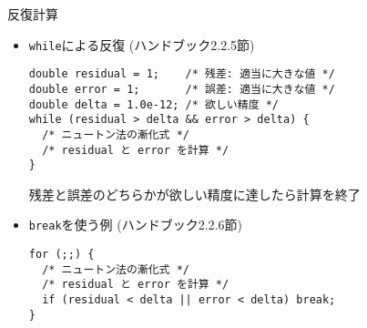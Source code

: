 \begin{frame}[t,fragile]{反復計算}
  \begin{itemize}
  \item {\tt while}による反復 (ハンドブック2.2.5節)
\begin{lstlisting}
double residual = 1;    /* 残差: 適当に大きな値 */
double error = 1;       /* 誤差: 適当に大きな値 */
double delta = 1.0e-12; /* 欲しい精度 */
while (residual > delta && error > delta) {
  /* ニュートン法の漸化式 */
  /* residual と error を計算 */
}
\end{lstlisting}
残差と誤差のどちらかが欲しい精度に達したら計算を終了
\item {\tt break}を使う例 (ハンドブック2.2.6節)
\begin{lstlisting}
for (;;) {
  /* ニュートン法の漸化式 */
  /* residual と error を計算 */
  if (residual < delta || error < delta) break;
}
\end{lstlisting}
  \end{itemize}
\end{frame}
